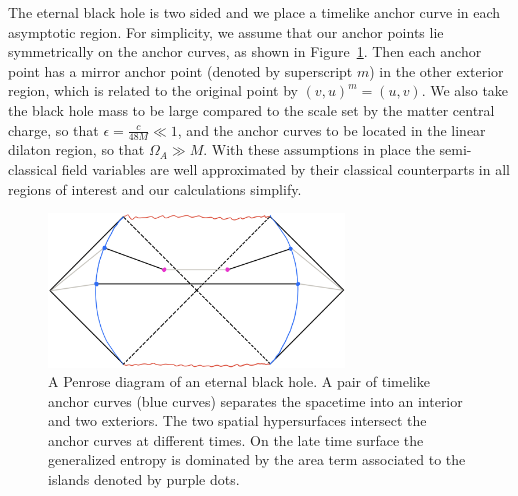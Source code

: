 \documentclass[12pt,a4paper]{article}
\newcommand{\f}[2]{\frac{#1}{#2}}
\begin{document}
The eternal black hole is two sided and we place a timelike anchor curve in each asymptotic region. For simplicity, we assume that our anchor points lie symmetrically on the anchor curves, as shown in Figure~\ref{eternal}. Then each anchor point has a mirror anchor point  (denoted by superscript $m$) in the other exterior region, which is related to the original point by $(v,u)^m = (u,v)$. 
We also take the black hole mass to be large compared to the scale set by the matter central charge, so that $\epsilon=\f{c}{48M}\ll 1$, and the anchor curves to be located in the linear dilaton region, so that $\Omega_A\gg M$. With these assumptions in place the semi-classical field variables are well approximated by their classical counterparts in all regions of interest and our calculations simplify.

\begin{figure}
\centering
\includegraphics[width=0.7\textwidth]{figures/1_penrose_eternal.jpeg}
\caption{\label{eternal} A Penrose diagram of an eternal black hole. A pair of timelike anchor curves (blue curves) separates the spacetime into an interior and two exteriors. The two spatial hypersurfaces intersect the anchor curves at different times. On the late time surface the generalized entropy is dominated by the area term associated to the islands denoted by purple dots.}
\end{figure}
\end{document}
